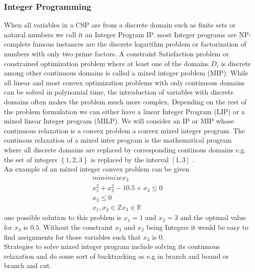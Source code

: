 \subsubsection{Integer Programming}
When all variables in a CSP are from a discrete domain such as finite sets or natural numbers we call it an Integer Program IP. most Integer programs are NP-complete famous instances are the discrete logarithm problem or factorization of numbers with only two prime factors. A constraint Satisfaction problem or constrained optimization problem where at least one of the domains $D_i$
is discrete among other continuous domains is called a mixed integer problem (MIP). While all linear and most convex optimization problems with only continuous domains can be solved in polynomial time, the introduction of variables with discrete domains often makes the problem much more complex. Depending on the rest of the problem formulation we can either have a linear Integer Program (LIP) or a mixed linear Integer program (MILP). We will consider an IP or MIP whose continuous relaxation is a convex problem a convex mixed integer program. The continous relaxation of a mixed inter program is the mathematical program where all discrete
domains are replaced by corresponding continous domains e.g. the set of integers 
$\left\lbrace 1,2,3 \right\rbrace $
 is replaced by the interval 
 $\left[ 1,3 \right] $
 .\\
An example of an mixed integer convex problem can be given
\begin{eqnarray}
minimize x_3 \\
x_1^2 + x_2^2 - 10.5 + x_3 \leq 0 \\
x_3 \leq 0\\
x_1,x_2\in \mathbb{Z} x_3\in \mathbb{R}
\end{eqnarray}
one possible solution to this problem is $x_1=1$ and $x_2=3$ and the optimal value for $x_3$ is $0.5$. Without the constraint $x_1$ and $x_2$ being Integers it would be easy to find assignments for those variables such that $x_3$ is $0$.\\
Strategies to solve mixed integer program include solving its continuous relaxation and do some sort of backtracking as e.g in branch and bound or branch and cut.
